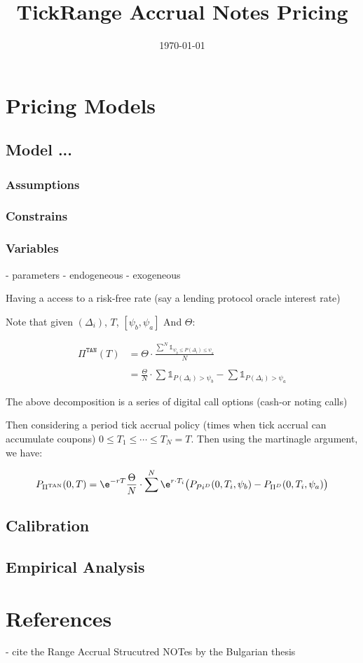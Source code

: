 \documentclass[11pt]{article}
\title{TickRange Accrual Notes Pricing}
\author{}
\date{\today}
\begin{document}
\maketitle
\tableofcontents


\section{Pricing Models}

\subsection{Model ...}

\subsubsection{Assumptions}
\subsubsection{Constrains}
\subsubsection{Variables}
- parameters
- endogeneous
- exogeneous


Having a access to a risk-free rate (say a lending protocol oracle interest rate)

Note that given \((\Delta_i)\), \(T\), \([\psi_b, \psi_a]\) And \(\Theta\):

\begin{align*}
  \Pi^{\texttt{TAN}} (T) &= \Theta \cdot \frac{\sum^N \mathbb{1}_{\psi_b \leq P(\Delta_i) \leq \psi_a}}{N} \\
  \\
  &= \frac{\Theta}{N}\cdot \sum \mathbb{1}_{P(\Delta_i) > \psi_b} - \sum \mathbb{1}_{P(\Delta_i) > \psi_a}
\end{align*}

The above decomposition is a series of digital call options (cash-or noting calls)


Then considering a period tick accrual policy (times when tick accrual can accumulate coupons)
\(0 \leq T_1 \leq \cdots \leq T_N = T\). Then using the martinagle argument, we have:

\begin{align*}
  P_{\Pi^{\text{TAN}}} (0, T) = \e^{-rT} \frac{\Theta}{N}\cdot \sum^N \e^{r\cdot T_i} \big ( P_{Pi^D} (0, T_i, \psi_b) - P_{\Pi^{D}} (0, T_i , \psi_a)\big)

\end{align*}

\subsection{Calibration}
\subsection{Empirical Analysis}
\section{References}

- cite the Range Accrual Strucutred NOTes by the Bulgarian thesis
\end{document}
